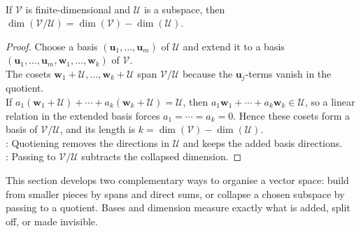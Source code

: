 \begin{theorem} \label{thm:dimension-of-quotient} \\
If $\mathcal{V}$ is finite-dimensional and $\mathcal{U}$ is a subspace, then $\dim(\mathcal{V}/\mathcal{U}) = \dim(\mathcal{V}) - \dim(\mathcal{U})$.
\begin{proof}
Choose a basis $(\mathbf{u}_1,\ldots,\mathbf{u}_m)$ of $\mathcal{U}$ and extend it to a basis $(\mathbf{u}_1,\ldots,\mathbf{u}_m,\mathbf{w}_1,\ldots,\mathbf{w}_k)$ of $\mathcal{V}$.\\
The cosets $\mathbf{w}_1+\mathcal{U},\ldots,\mathbf{w}_k+\mathcal{U}$ span $\mathcal{V}/\mathcal{U}$ because the $\mathbf{u}_j$-terms vanish in the quotient.\\
If $a_1(\mathbf{w}_1+\mathcal{U})+\cdots+a_k(\mathbf{w}_k+\mathcal{U})=\mathcal{U}$, then $a_1\mathbf{w}_1+\cdots+a_k\mathbf{w}_k\in\mathcal{U}$, so a linear relation in the extended basis forces $a_1=\cdots=a_k=0$. Hence these cosets form a basis of $\mathcal{V}/\mathcal{U}$, and its length is $k=\dim(\mathcal{V})-\dim(\mathcal{U})$.\\
: Quotiening removes the directions in $\mathcal{U}$ and keeps the added basis directions.\\
: Passing to $\mathcal{V}/\mathcal{U}$ subtracts the collapsed dimension.
\end{proof}
\end{theorem}

This section develops two complementary ways to organise a vector space: build from smaller pieces by spans and direct sums, or collapse a chosen subspace by passing to a quotient. Bases and dimension measure exactly what is added, split off, or made invisible.
